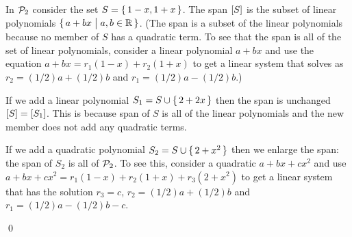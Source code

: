 \documentclass[10pt,t,serif,professionalfont]{beamer}
\begin{document}
\begin{frame}
\ex 
In $\mathcal{P}_2$ consider the set $S=\mbox{$\{\,1-x,1+x\,\}$}$.
The span $\relax [S\relax ]$ is the subset of
linear polynomials $\mbox{$\{\,a+bx\bigm| a,b\in\mathbb{R}\,\}$}$.
(The span is a subset of the linear polynomials because no member of
$S$ has a quadratic term.
To see that the span is all of the set of linear polynomials, consider 
a linear polynomial $a+bx$ and use
the equation $a+bx=r_1(1-x)+r_2(1+x)$ to get a linear system
that solves as $r_2=(1/2)a+(1/2)b$ and 
$r_1=(1/2)a-(1/2)b$.)  

\pause
If we add a linear polynomial $S_1=S\cup\mbox{$\{\,2+2x\,\}$}$
then the span is unchanged $\relax [S\relax ]=\relax [S_1\relax ]$.
This is because span of $S$ is all of the linear polynomials 
and the new 
member does not add any quadratic terms.

\pause
If we add a quadratic polynomial 
$S_2=S\cup\mbox{$\{\,2+x^2\,\}$}$ then we enlarge the span: 
the span of $S_2$ is all of $\mathcal{P}_2$.
To see this, consider a quadratic $a+bx+cx^2$ and use  
$a+bx+cx^2=r_1(1-x)+r_2(1+x)+r_3(2+x^2)$ to get a linear system
that has the solution $r_3=c$, $r_2=(1/2)a+(1/2)b$ and $r_1=(1/2)a-(1/2)b-c$.
\end{frame}



\begin{frame}
\co[th:AlwaysAnLDSubset]

\pause
\pf
{}

\pause
{}

\pause
{}
\qed
\end{frame}
\end{document}
